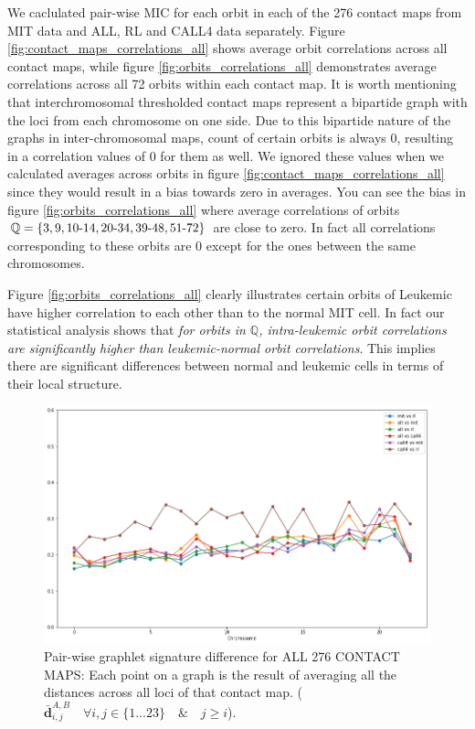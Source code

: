 \documentclass[a4,center,fleqn]{NAR}
\begin{document}
We caclulated pair-wise MIC for each orbit in each of the 276
contact maps from MIT data and ALL, RL and CALL4 data separately. 
Figure \ref{fig:contact_maps_correlations_all}
shows average orbit correlations across all contact maps, while
figure \ref{fig:orbits_correlations_all} 
demonstrates average correlations across all 72 orbits within each  contact map.
It is worth mentioning that interchromosomal thresholded contact maps 
represent
a bipartide graph with the loci from each chromosome on one side. Due to this
bipartide nature of the graphs in inter-chromosomal maps,
count of certain orbits is always 0, resulting in
a correlation values of 0 for them as well.
We ignored these values  when we calculated averages across orbits 
in figure \ref{fig:contact_maps_correlations_all} since they
would result in a bias towards zero in averages. You can see the bias in 
figure \ref{fig:orbits_correlations_all} where average correlations of orbits
$\mathbb{Q} = \{3, 9, 10{\text -}14, 20{\text -}34, 39{\text -}48, 51{\text -}72\}$ 
are close to zero. In fact all correlations
corresponding to these orbits are 0 except for the ones between the same 
chromosomes.

Figure \ref{fig:orbits_correlations_all} clearly illustrates certain
orbits of Leukemic have higher correlation to each other than to the
normal MIT cell. In fact our statistical analysis shows that 
\textit {for orbits in $\mathbb{Q}$, 
intra-leukemic orbit correlations are significantly higher
than leukemic-normal orbit correlations}. This implies
there are significant differences between normal and
leukemic cells in terms of their local structure.
\begin{figure}
    \includegraphics[width=.5\textwidth]{figures/orbit_distances_intra.png}
    \caption{
        Pair-wise graphlet signature difference for
        ALL 276 CONTACT MAPS:
        Each point on a graph is the result of averaging all
        the distances across all loci of that contact map.
        ($\bar{\mathbf{d}}^{\scriptscriptstyle A,B}_{i,j} \quad
        \forall i,j \in \{1 ... 23\} \quad \& \quad j \ge i$).  
    }
    \label{fig:orbit_distances_intra}
\end{figure}
\end{document}
